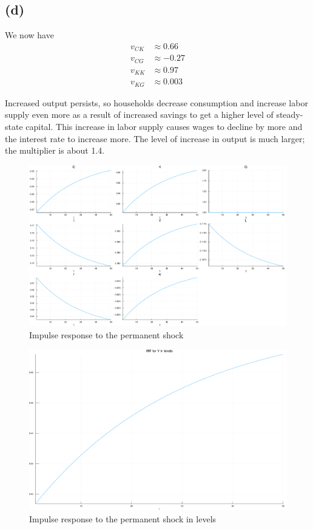 \documentclass[11pt]{amsart}
\begin{document}
\subsection*{(d)}

We now have
	\begin{align*}
	v_{CK} &\approx 0.66 \\
	v_{CG} &\approx -0.27 \\
	v_{KK} &\approx 0.97 \\
	v_{KG} &\approx 0.003 
	\end{align*}
	
	Increased output persists, so households decrease consumption and increase labor supply even more as a result of increased savings to get a higher level of steady-state capital. This increase in labor supply causes wages to decline by more and the interest rate to increase more. The level of increase in output is much larger; the multiplier is about 1.4.
	
	\begin{figure}[htbp]
\begin{center}
\includegraphics[width=\textwidth]{Ken/output/IRF_d_plot.pdf}
\caption{Impulse response to the permanent shock}
\label{5d}
\end{center}
\end{figure}


\begin{figure}[htbp]
\begin{center}
\includegraphics[width=\textwidth]{Ken/output/IRF_d_Y_plot.pdf}
\caption{Impulse response to the permanent shock in levels}
\label{5b}
\end{center}
\end{figure}
\end{document}
